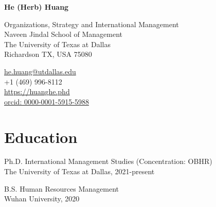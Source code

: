 \documentclass[12pt,letterpaper]{report} %
\newcommand{\myname}{He (Herb) Huang}
\newcommand{\namefont}[1]{{\normalfont\bfseries\Large{#1}}}
\begin{document}
    \raggedright{}

    \begin{center}\namefont{\myname}\end{center}

    \vspace{1em}
    \begin{minipage}[t]{0.700\textwidth}
        Organizations, Strategy and International Management \\
        Naveen Jindal School of Management \\
        The University of Texas at Dallas \\
        Richardson TX, USA 75080
    \end{minipage}
    \begin{minipage}[t]{0.295\textwidth}
        \flushright{}
        \href{mailto:he.huang@utdallas.edu}{he.huang@utdallas.edu} \\
        +1 (469) 996-8112 \\
        \href{https://huanghe.phd}{https://huanghe.phd} \\   \href{https://orcid.org/0000-0001-5915-5988}{orcid: 0000-0001-5915-5988}
        
    \end{minipage}


    \section*{Education}

    \begin{tablist}

        \item[Ph.D.]\tab{}International Management Studies (Concentration: OBHR) \\The University of Texas at Dallas, 2021-present
        \item[B.S.] \tab{}Human Resources Management\\Wuhan University, 2020

    \end{tablist}



\end{document}
